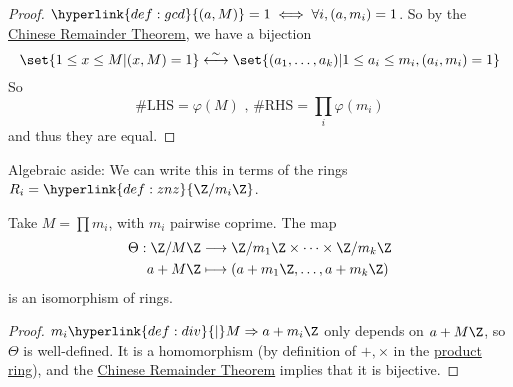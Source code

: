 \documentclass{article}
\begin{document}
\begin{proof}
    $\hyperlink{def:gcd}{(a, M)} = 1 \iff \forall i, (a, m_i)=1$. So by the \hyperlink{thm:crt}{Chinese Remainder Theorem}, we have a bijection
    \begin{equation*}
        \set{ 1 \leq x \leq M | (x, M) = 1} \stackrel{\sim}{\longleftrightarrow} \set{ (a_1, \dotsc, a_k) | 1 \leq a_i \leq m_i, (a_i, m_i) = 1 }
    \end{equation*} So
    \begin{equation*}
        \#\text{LHS} = \varphi (M) \text{ , } \#\text{RHS} = \prod_i \varphi (m_i)
    \end{equation*}
    and thus they are equal.
\end{proof}

Algebraic aside: We can write this in terms of the rings $R_i = \hyperlink{def:znz}{\Z / m_i \Z}$.


\begin{nthm}
    Take $M = \prod m_i$, with $ m_i$ pairwise coprime.
    The map
    \begin{align*}
        \Theta : \Z/M\Z &\longrightarrow \Z/m_1\Z \times \cdots \times \Z / m_k \Z \\
                       a + M \Z &\longmapsto (a + m_1 \Z, \dotsc , a + m_k \Z )
    \end{align*}
    is an isomorphism of rings.
\end{nthm}

\begin{proof}
    $m_i \hyperlink{def:div}{\mid} M \Rightarrow a+m_i \Z$ only depends on $a + M\Z$, so $\Theta$ is well-defined.
    It is a homomorphism (by definition of $+, \times$ in the \hyperlink{def:prodRing}{product ring}), and the \hyperlink{thm:crt}{Chinese Remainder Theorem} implies that it is bijective.
\end{proof}

\end{document}
